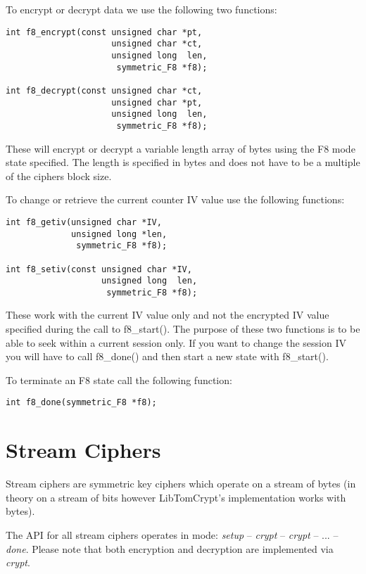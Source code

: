 \documentclass[synpaper]{book}
\begin{document}
To encrypt or decrypt data we use the following two functions:

 
\begin{verbatim}
int f8_encrypt(const unsigned char *pt,
                     unsigned char *ct,
                     unsigned long  len,
                      symmetric_F8 *f8);

int f8_decrypt(const unsigned char *ct,
                     unsigned char *pt,
                     unsigned long  len,
                      symmetric_F8 *f8);
\end{verbatim}
These will encrypt or decrypt a variable length array of bytes using the F8 mode state specified.  The length is specified in bytes and does not have to be a multiple
of the ciphers block size.

To change or retrieve the current counter IV value use the following functions:
 
\begin{verbatim}
int f8_getiv(unsigned char *IV,
             unsigned long *len,
              symmetric_F8 *f8);

int f8_setiv(const unsigned char *IV,
                   unsigned long  len,
                    symmetric_F8 *f8);
\end{verbatim}
These work with the current IV value only and not the encrypted IV value specified during the call to f8\_start().  The purpose of these two functions is to be
able to seek within a current session only.  If you want to change the session IV you will have to call f8\_done() and then start a new state with
f8\_start().

To terminate an F8 state call the following function:

\begin{verbatim}
int f8_done(symmetric_F8 *f8);
\end{verbatim}

\chapter{Stream Ciphers}

Stream ciphers are symmetric key ciphers which operate on a stream of bytes (in theory on a stream of bits
however LibTomCrypt's implementation works with bytes).

The API for all stream ciphers operates in mode: \textit{setup} -- \textit{crypt} -- \textit{crypt} -- ... -- \textit{done}.
Please note that both encryption and decryption are implemented via \textit{crypt}.
\end{document}
